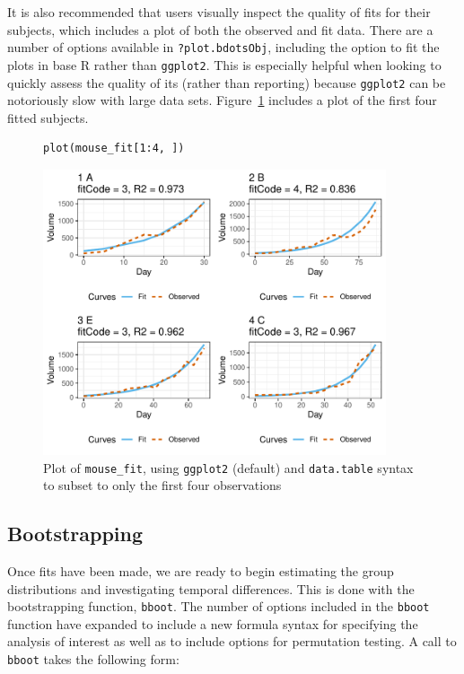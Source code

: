 \documentclass{article}
\newcommand{\xt}{\texttt}%
\begin{document}
It is also recommended that users visually inspect the quality of fits for their subjects, which includes a plot of both the observed and fit data. There are a number of options available in \xt{?plot.bdotsObj}, including the option to fit the plots in base R rather than \xt{ggplot2}. This is especially helpful when looking to quickly assess the quality of its (rather than reporting) because \xt{ggplot2} can be notoriously slow with large data sets. Figure~\ref{fig:plot_fits} includes a plot of the first four fitted subjects.


\begin{singlespace}
\begin{figure}[H]
\centering
\begin{BVerbatim}
plot(mouse_fit[1:4, ])
\end{BVerbatim}
\end{figure}
\end{singlespace}

\begin{figure}[H]
\centering
\includegraphics[width=0.9\textwidth]{img/mouse_fit.pdf}
\caption{Plot of \xt{mouse\_fit}, using  \xt{ggplot2} (default) and \xt{data.table} syntax to subset to only the first four observations}
\label{fig:plot_fits}
\end{figure}

\subsection{Bootstrapping}

Once fits have been made, we are ready to begin estimating the group distributions and investigating temporal differences. This is done with the bootstrapping function, \xt{bboot}. The number of options included in the \xt{bboot} function have expanded to include a new formula syntax for specifying the analysis of interest as well as to include options for permutation testing. A call to \xt{bboot} takes the following form:
\end{document}
